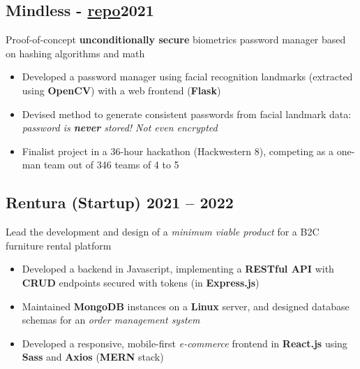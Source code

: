 \documentclass[9pt]{article}
\begin{document}
\subsection{Mindless \normalsize\textnormal{- \href{https://github.com/ianayl/mindless}{repo}}\hfill \normalsize\textnormal{2021}}
    Proof-of-concept \textbf{unconditionally secure} biometrics password manager based on hashing algorithms and math
    \vspace{-0.5em}
\begin{itemize}
  \item Developed a password manager using facial recognition landmarks (extracted using \textbf{OpenCV}) with a web frontend (\textbf{Flask})
  \item Devised method to generate consistent passwords from facial landmark data: \textit{password is \textbf{never} stored! Not even encrypted}
    \item Finalist project in a 36-hour hackathon (Hackwestern 8), competing as a one-man team out of 346 teams of 4 to 5
\end{itemize}

\subsection{Rentura \textnormal{(Startup)} \hfill \normalsize\textnormal{2021 -- 2022}}
Lead the development and design of a \textit{minimum viable product} for a B2C furniture rental platform
\vspace{-0.5em}
\begin{itemize}
  \item Developed a backend in Javascript, implementing a \textbf{RESTful API} with \textbf{CRUD} endpoints secured with tokens (in \textbf{Express.js})
  \item Maintained \textbf{MongoDB} instances on a \textbf{Linux} server, and designed database schemas for an \textit{order management system }
  \item Developed a responsive, mobile-first \textit{e-commerce} frontend in \textbf{React.js} using \textbf{Sass} and \textbf{Axios} (\textbf{MERN} stack)
\end{itemize}
\end{document}

